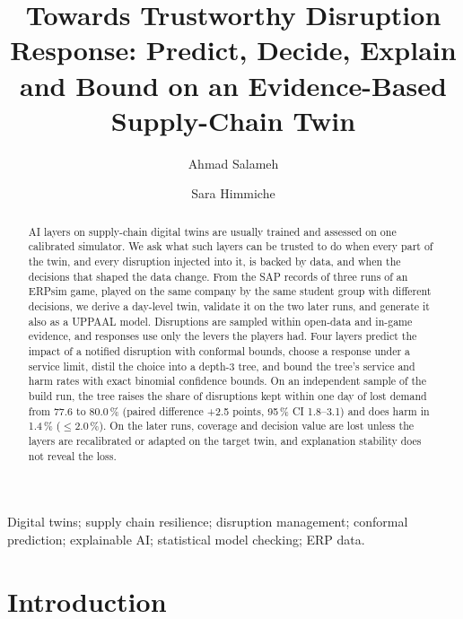 \documentclass{ifacconf}
\begin{document}
\begin{frontmatter}

\title{Towards Trustworthy Disruption Response: Predict, Decide, Explain and Bound on an Evidence-Based
Supply-Chain Twin}

\author[First]{Ahmad Salameh}
\author[First]{Sara Himmiche}

\address[First]{SYMME, Universit\'e Savoie Mont Blanc, Annecy, France}%

\begin{abstract}
AI layers on supply-chain digital twins are usually trained and assessed on one calibrated simulator. We ask
what such layers can be trusted to do when every part of the twin, and every disruption injected into it, is
backed by data, and when the decisions that shaped the data change. From the SAP records of three runs of an
ERPsim game, played on the same company by the same student group with different decisions, we derive a day-level
twin, validate it on the two later runs, and generate it also as a UPPAAL model. Disruptions are sampled within
open-data and in-game evidence, and responses use only the levers the players had. Four layers predict the impact
of a notified disruption with conformal bounds, choose a response under a service limit, distil the choice into a
depth-3 tree, and bound the tree's service and harm rates with exact binomial confidence bounds. On an independent
sample of the build run, the tree raises the share of disruptions kept within one day of lost demand from 77.6 to
80.0\,\% (paired difference +2.5 points, 95\,\% CI 1.8--3.1) and does harm in 1.4\,\% ($\le$2.0\,\%). On the later
runs, coverage and decision value are lost unless the layers are recalibrated or adapted on the target twin, and
explanation stability does not reveal the loss.
\end{abstract}

\begin{keyword}
Digital twins; supply chain resilience; disruption management; conformal prediction; explainable AI; statistical
model checking; ERP data.
\end{keyword}

\end{frontmatter}

\section{Introduction}
\end{document}

